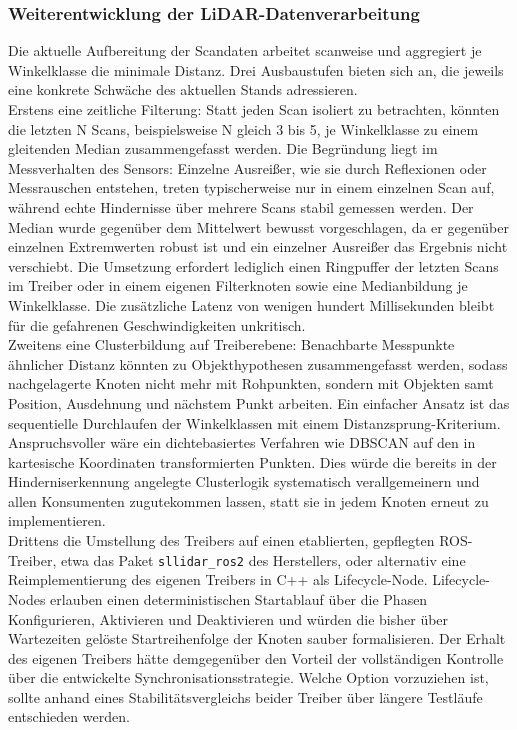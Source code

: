 \subsubsection{Weiterentwicklung der LiDAR-Datenverarbeitung}
Die aktuelle Aufbereitung der Scandaten arbeitet scanweise und aggregiert je Winkelklasse die minimale Distanz. Drei Ausbaustufen bieten sich an, die jeweils eine konkrete Schwäche des aktuellen Stands adressieren.
\\
Erstens eine zeitliche Filterung: Statt jeden Scan isoliert zu betrachten, könnten die letzten N Scans, beispielsweise N gleich 3 bis 5, je Winkelklasse zu einem gleitenden Median zusammengefasst werden. Die Begründung liegt im Messverhalten des Sensors: Einzelne Ausreißer, wie sie durch Reflexionen oder Messrauschen entstehen, treten typischerweise nur in einem einzelnen Scan auf, während echte Hindernisse über mehrere Scans stabil gemessen werden. Der Median wurde gegenüber dem Mittelwert bewusst vorgeschlagen, da er gegenüber einzelnen Extremwerten robust ist und ein einzelner Ausreißer das Ergebnis nicht verschiebt. Die Umsetzung erfordert lediglich einen Ringpuffer der letzten Scans im Treiber oder in einem eigenen Filterknoten sowie eine Medianbildung je Winkelklasse. Die zusätzliche Latenz von wenigen hundert Millisekunden bleibt für die gefahrenen Geschwindigkeiten unkritisch.
\\
Zweitens eine Clusterbildung auf Treiberebene: Benachbarte Messpunkte ähnlicher Distanz könnten zu Objekthypothesen zusammengefasst werden, sodass nachgelagerte Knoten nicht mehr mit Rohpunkten, sondern mit Objekten samt Position, Ausdehnung und nächstem Punkt arbeiten. Ein einfacher Ansatz ist das sequentielle Durchlaufen der Winkelklassen mit einem Distanzsprung-Kriterium. Anspruchsvoller wäre ein dichtebasiertes Verfahren wie DBSCAN \cite{schubert2017dbscan} auf den in kartesische Koordinaten transformierten Punkten. Dies würde die bereits in der Hinderniserkennung angelegte Clusterlogik systematisch verallgemeinern und allen Konsumenten zugutekommen lassen, statt sie in jedem Knoten erneut zu implementieren.
\\
Drittens die Umstellung des Treibers auf einen etablierten, gepflegten ROS-Treiber, etwa das Paket \texttt{sllidar\_ros2} des Herstellers, oder alternativ eine Reimplementierung des eigenen Treibers in C++ als Lifecycle-Node. Lifecycle-Nodes erlauben einen deterministischen Startablauf über die Phasen Konfigurieren, Aktivieren und Deaktivieren und würden die bisher über Wartezeiten gelöste Startreihenfolge der Knoten sauber formalisieren. Der Erhalt des eigenen Treibers hätte demgegenüber den Vorteil der vollständigen Kontrolle über die entwickelte Synchronisationsstrategie. Welche Option vorzuziehen ist, sollte anhand eines Stabilitätsvergleichs beider Treiber über längere Testläufe entschieden werden.

